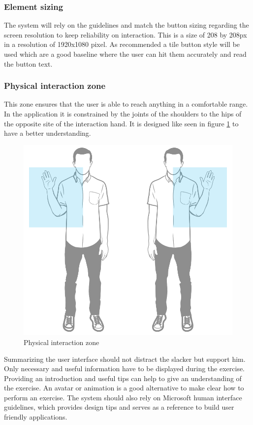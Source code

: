\subsubsection{Element sizing}
The system will rely on the guidelines and match the button sizing regarding the screen resolution to keep reliability on interaction. This is a size of 208 by 208px in a resolution of 1920x1080 pixel. As recommended a tile button style will be used which are a good baseline where the user can hit them accurately and read the button text.

\subsubsection{Physical interaction zone}
This zone ensures that the user is able to reach anything in a comfortable range. In the application it is constrained by the joints of the shoulders to the hips of the opposite site of the interaction hand. It is designed like seen in figure \ref{fig:higPHIZ} to have a better understanding.
\begin{figure}[htb]
	\centering
	\begin{minipage}[t]{1\linewidth}
		\centering
		\includegraphics[width=0.32\linewidth]{Pictures/higPHIZ}
		\caption{Physical interaction zone~\cite{MicrosoftHIG2014-mh}}
		\label{fig:higPHIZ}
	\end{minipage}
\end{figure}

Summarizing the user interface should not distract the slacker but support him. Only necessary and useful information have to be displayed during the exercise. Providing an introduction and useful tips can help to give an understanding of the exercise. An avatar or animation is a good alternative to make clear how to perform an exercise. The system should also rely on Microsoft human interface guidelines, which provides design tips and serves as a reference to build user friendly applications.
